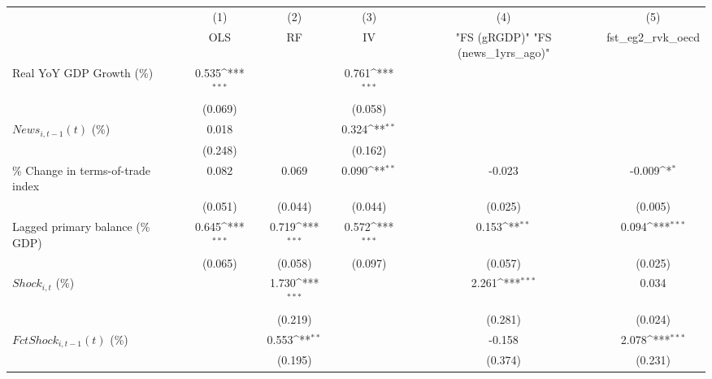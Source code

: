 {
\def\sym#1{\ifmmode^{#1}\else\(^{#1}\)\fi}
\begin{tabular}{l*{5}{c}}
\toprule
                    &\multicolumn{1}{c}{(1)}&\multicolumn{1}{c}{(2)}&\multicolumn{1}{c}{(3)}&\multicolumn{1}{c}{(4)}&\multicolumn{1}{c}{(5)}\\
                    &\multicolumn{1}{c}{OLS}&\multicolumn{1}{c}{RF}&\multicolumn{1}{c}{IV}&\multicolumn{1}{c}{ "FS (gRGDP)"  "FS (news_1yrs_ago)" }&\multicolumn{1}{c}{fst_eg2_rvk_oecd}\\
\midrule
Real YoY GDP Growth (\%)&       0.535\sym{***}&                     &       0.761\sym{***}&                     &                     \\
                    &     (0.069)         &                     &     (0.058)         &                     &                     \\
\addlinespace
$ News_{i,t-1}(t)$ (\%)&       0.018         &                     &       0.324\sym{**} &                     &                     \\
                    &     (0.248)         &                     &     (0.162)         &                     &                     \\
\addlinespace
\% Change in terms-of-trade index&       0.082         &       0.069         &       0.090\sym{**} &      -0.023         &      -0.009\sym{*}  \\
                    &     (0.051)         &     (0.044)         &     (0.044)         &     (0.025)         &     (0.005)         \\
\addlinespace
Lagged primary balance (\% GDP)&       0.645\sym{***}&       0.719\sym{***}&       0.572\sym{***}&       0.153\sym{**} &       0.094\sym{***}\\
                    &     (0.065)         &     (0.058)         &     (0.097)         &     (0.057)         &     (0.025)         \\
\addlinespace
$ Shock_{i,t}$ (\%) &                     &       1.730\sym{***}&                     &       2.261\sym{***}&       0.034         \\
                    &                     &     (0.219)         &                     &     (0.281)         &     (0.024)         \\
\addlinespace
$ FctShock_{i,t-1}(t)$ (\%)&                     &       0.553\sym{**} &                     &      -0.158         &       2.078\sym{***}\\
                    &                     &     (0.195)         &                     &     (0.374)         &     (0.231)         \\

\end{tabular}}

